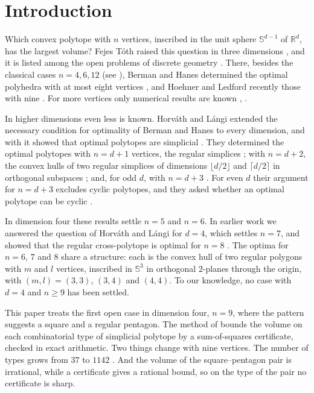 \section{Introduction}
\label{sec:intro}

Which convex polytope with $n$ vertices, inscribed in the unit sphere
$\mathbb{S}^{d-1}$ of $\mathbb{R}^{d}$, has the largest volume? Fejes T\'{o}th
raised this question in three dimensions \cite{fejes-toth-1964}, and it is
listed among the open problems of discrete geometry
\cite{brass-moser-pach-2005}. There, besides the classical cases $n = 4, 6,
12$ (see \cite[Section~1.2]{hoehner-ledford-2026}), Berman and Hanes
determined the optimal polyhedra with at most eight vertices
\cite{berman-hanes-1970}, and Hoehner and Ledford recently those with nine
\cite{hoehner-ledford-2026}. For more vertices only numerical results are
known \cite{mutoh-2003}, \cite{hardin-sloane-smith}.

In higher dimensions even less is known. Horv\'{a}th and L\'{a}ngi extended
the necessary condition for optimality of Berman and Hanes to every dimension,
and with it showed that optimal polytopes are simplicial
\cite[Lemma~1]{horvath-langi-2016}. They determined the optimal polytopes with
$n = d + 1$ vertices, the regular simplices
\cite[Corollary~1]{horvath-langi-2016}; with $n = d + 2$, the convex hulls of
two regular simplices of dimensions $\lfloor d/2\rfloor$ and $\lceil
d/2\rceil$ in orthogonal subspaces \cite[Theorem~2]{horvath-langi-2016}; and,
for odd $d$, with $n = d + 3$ \cite[Theorem~3]{horvath-langi-2016}. For even
$d$ their argument for $n = d + 3$ excludes cyclic polytopes, and they asked
whether an optimal polytope can be cyclic
\cite[Problem~2]{horvath-langi-2016}.

In dimension four these results settle $n = 5$ and $n = 6$. In earlier work
we answered the question of Horv\'{a}th and L\'{a}ngi for $d = 4$, which
settles $n = 7$, and showed that the regular cross-polytope is optimal for
$n = 8$ \cite{medgyes-maxvol-d4}. The optima for $n = 6$, $7$ and $8$ share a
structure: each is the convex hull of two regular polygons with $m$ and $l$
vertices, inscribed in $\mathbb{S}^{3}$ in orthogonal $2$-planes through the
origin, with $(m, l) = (3, 3)$, $(3, 4)$ and $(4, 4)$. To our knowledge, no case with $d = 4$
and $n \geq 9$ has been settled.

This paper treats the first open case in dimension four, $n = 9$, where the
pattern suggests a square and a regular pentagon. The method of
\cite{medgyes-maxvol-d4} bounds the volume on each combinatorial type of
simplicial polytope by a sum-of-squares certificate, checked in exact
arithmetic. Two things change with nine vertices. The number of types grows
from $37$ \cite{grunbaum-sreedharan-1967} to $1142$
\cite{altshuler-bokowski-steinberg-1980}. And the volume of the square--pentagon pair is
irrational, while a certificate gives a rational bound, so on the type of the
pair no certificate is sharp.

